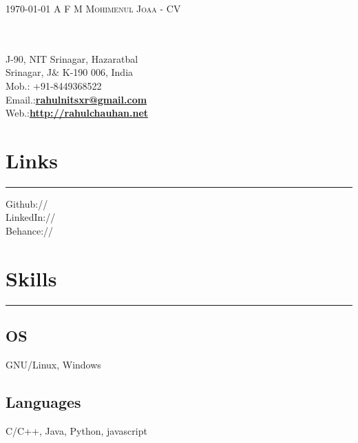 \documentclass[localFont,alternative,10pt,compact]{main}
\begin{document}
    \makecvfooter
    {\textsc{\today}} %
    {\textsc{A F M Mohimenul Joaa - CV}}
    {\thepage}

%
%


    \begin{minipage}[t]{0.33\textwidth}
        \hspace*{0pt}\hfill    \\
        \hspace*{0pt}\hfill    \\
        J-90, NIT Srinagar, Hazaratbal \\
        Srinagar, J$\&$ K-190 006, India \\
        Mob.: +91-8449368522 \\
        Email.:\textbf{\href{mailto:rahulnitsxr@gmail.com}{rahulnitsxr@gmail.com}} \\
        Web.:\textbf{\href{http://rahulchauhan.net}{http://rahulchauhan.net}}


        \section{Links}
        \noindent\rule{5cm}{0.4pt}

        Github:// \href{https://github.com/rahulworld}{} \\
        LinkedIn://  \href{https://www.linkedin.com/in/rahulworld}{} \\
        Behance://  \href{https://www.behance.net/rahul_world}{}


        \section{Skills}
        \noindent\rule{5cm}{0.4pt}

        \subsection{OS}
        GNU/Linux, Windows
        \vspace{6pt}

        \subsection{Languages}
        C/C++, Java, Python, javascript
        \vspace{6pt}


\end{minipage}
\end{document}
